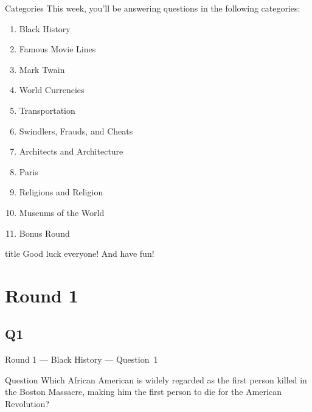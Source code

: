 \documentclass[11pt]{beamer}
\begin{document}
\begingroup{}
\begingroup{}
\begin{frame}[t]{Categories}
This week, you'll be answering questions in the following categories:
\begin{enumerate}
\item Black History
\item Famous Movie Lines
\item Mark Twain
\item World Currencies
\item Transportation
\item Swindlers, Frauds, and Cheats
\item Architects and Architecture
\item Paris
\item Religions and Religion
\item Museums of the World
\item Bonus Round
\end{enumerate}
\end{frame}
\endgroup{}

\begingroup{}
\begin{frame}
\vfill{}
\begin{beamercolorbox}[sep=8pt,center,shadow=true,rounded=true]{title}
Good luck everyone! And have fun!
\end{beamercolorbox}
\vfill{}
\end{frame}
\endgroup{}
\def\thisSectionName{Black History}
\section{Round 1}
\subsection*{Q1}
\begin{frame}[t]{Round 1 --- Black History --- \mbox{Question 1}}
\vspace{-0.5em}
\begin{block}{Question}
Which African American is widely regarded as the first person killed in the Boston Massacre, making him the first person to die for the American Revolution?
\end{block}
\end{frame}
\end{document}
